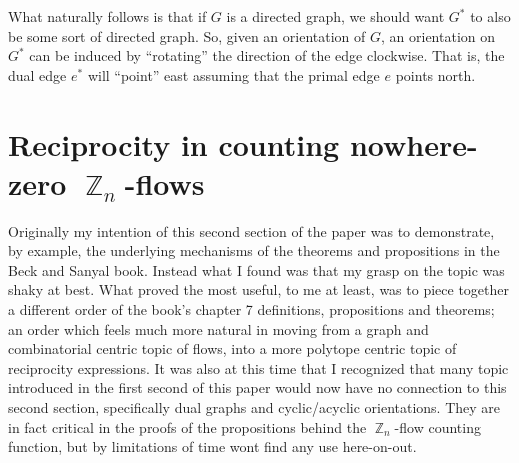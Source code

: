 \documentclass{amsart}
\DeclareMathOperator{\Z}{\mathbb{Z}}
\theoremstyle{plain}
\theoremstyle{remark}
\theoremstyle{definition}
\begin{document}
What naturally follows is that if $G$ is a directed graph, we should want
$G^*$ to also be some sort of directed graph.
So, given an orientation of $G$, an orientation on $G^*$ can be induced by
``rotating'' the direction of the edge clockwise. That is, the dual edge $e^*$
will ``point'' east assuming that the primal edge $e$ points north.

\hrulefill

\section{Reciprocity in counting nowhere-zero $\Z_n$-flows}

Originally my intention of this second section of the paper was to demonstrate,
by example, the underlying mechanisms of the theorems and propositions in the
Beck and Sanyal book. Instead what I found was that my grasp on the topic was
shaky at best. What proved the most useful, to me at least, was to piece
together a different order of the book's chapter 7 definitions, propositions and
theorems; an order which feels much more natural in moving from a graph and
combinatorial centric topic of flows, into a more polytope centric topic of
reciprocity expressions.
It was also at this time that I recognized that many topic introduced in the
first second of this paper would now have no connection to this second section,
specifically dual graphs and cyclic/acyclic orientations.
They are in fact critical in the proofs of the propositions behind the
$\Z_n$-flow counting function, but by limitations of time wont find any use
here-on-out.
\end{document}
